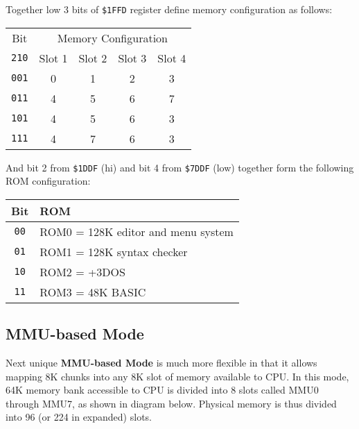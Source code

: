 \documentclass[oneside,a4paper]{book}
\newcommand{\notet}{\rule{0pt}{2.4ex}}
\begin{document}
Together low 3 bits of {\tt \$1FFD} register define memory configuration as follows:

\begin{tabular}{ccccc}
	Bit & \multicolumn{4}{c}{Memory Configuration} \\
	{\tt 210} & Slot 1 & Slot 2 & Slot 3 & Slot 4 \\
	\hline
	{\tt 001}\notet & 0 & 1 & 2 & 3 \\
	{\tt 011} & 4 & 5 & 6 & 7 \\
	{\tt 101} & 4 & 5 & 6 & 3 \\
	{\tt 111} & 4 & 7 & 6 & 3 \\
\end{tabular}

And bit 2 from {\tt \$1DDF} (hi) and bit 4 from {\tt \$7DDF} (low) together form the following ROM configuration:

\begin{tabular}{cl}
	Bit & ROM \\
	\hline
	{\tt 00}\notet & ROM0 = 128K editor and menu system \\
	{\tt 01} & ROM1 = 128K syntax checker \\
	{\tt 10} & ROM2 = +3DOS \\
	{\tt 11} & ROM3 = 48K BASIC \\
\end{tabular}


\subsection{MMU-based Mode}

Next unique \textbf{MMU-based Mode} is much more flexible in that it allows mapping 8K chunks into any 8K slot of memory available to CPU. In this mode, 64K memory bank accessible to CPU is divided into 8 slots called MMU0 through MMU7, as shown in diagram below. Physical memory is thus divided into 96 (or 224 in expanded) slots.
\end{document}
